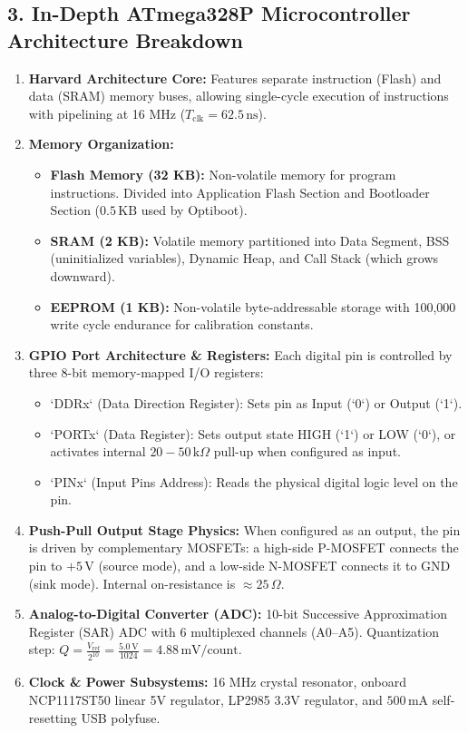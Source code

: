 \documentclass[11pt,a4paper]{article}
\begin{document}
\subsection*{3. In-Depth ATmega328P Microcontroller Architecture Breakdown}
\begin{enumerate}[leftmargin=*]
    \item \textbf{Harvard Architecture Core:} Features separate instruction (Flash) and data (SRAM) memory buses, allowing single-cycle execution of instructions with pipelining at 16 MHz ($T_{\text{clk}} = 62.5\,\text{ns}$).
    \item \textbf{Memory Organization:}
    \begin{itemize}[noitemsep]
        \item \textbf{Flash Memory (32 KB):} Non-volatile memory for program instructions. Divided into Application Flash Section and Bootloader Section ($0.5\,\text{KB}$ used by Optiboot).
        \item \textbf{SRAM (2 KB):} Volatile memory partitioned into Data Segment, BSS (uninitialized variables), Dynamic Heap, and Call Stack (which grows downward).
        \item \textbf{EEPROM (1 KB):} Non-volatile byte-addressable storage with 100,000 write cycle endurance for calibration constants.
    \end{itemize}
    \item \textbf{GPIO Port Architecture \& Registers:} Each digital pin is controlled by three 8-bit memory-mapped I/O registers:
    \begin{itemize}[noitemsep]
        \item `DDRx` (Data Direction Register): Sets pin as Input (`0`) or Output (`1`).
        \item `PORTx` (Data Register): Sets output state HIGH (`1`) or LOW (`0`), or activates internal $20-50\,\text{k}\Omega$ pull-up when configured as input.
        \item `PINx` (Input Pins Address): Reads the physical digital logic level on the pin.
    \end{itemize}
    \item \textbf{Push-Pull Output Stage Physics:} When configured as an output, the pin is driven by complementary MOSFETs: a high-side P-MOSFET connects the pin to $+5\,\text{V}$ (source mode), and a low-side N-MOSFET connects it to GND (sink mode). Internal on-resistance is $\approx 25\,\Omega$.
    \item \textbf{Analog-to-Digital Converter (ADC):} 10-bit Successive Approximation Register (SAR) ADC with 6 multiplexed channels (A0--A5). Quantization step: $Q = \frac{V_{\text{ref}}}{2^{10}} = \frac{5.0\,\text{V}}{1024} = 4.88\,\text{mV/count}$.
    \item \textbf{Clock \& Power Subsystems:} 16 MHz crystal resonator, onboard NCP1117ST50 linear 5V regulator, LP2985 3.3V regulator, and $500\,\text{mA}$ self-resetting USB polyfuse.
\end{enumerate}
\end{document}
